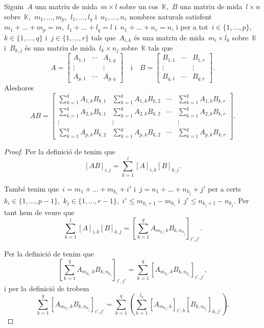 \documentclass[../../Main.tex]{subfiles}
\begin{document}
	\begin{proposition}
		\label{prop:producte de matrius en blocs}
		Siguin~\(A\) una matriu de mida~\(m\times l\) sobre un cos~\(\mathbb{K}\),~\(B\) una matriu de mida~\(l\times n\) sobre~\(\mathbb{K}\),~\(m_{1},\dots,m_{p}\),~\(l_{1},\dots,l_{q}\) i~\(n_{1},\dots,n_{r}\) nombres naturals satisfent~\(m_{1}+\dots+m_{p}=m\),~\(l_{1}+\dots+l_{q}=l\) i~\(n_{1}+\dots+n_{r}=n\), i per a tot~\(i\in\{1,\dots,p\}\),~\(k\in\{1,\dots,q\}\) i~\(j\in\{1,\dots,r\}\) tals que~\(A_{i,k}\) és una matriu de mida~\(m_{i}\times l_{k}\) sobre~\(\mathbb{K}\) i~\(B_{k,j}\) és una matriu de mida~\(l_{k}\times n_{j}\) sobre~\(\mathbb{K}\) tals que
		\[A=\left[\begin{matrix}
		A_{1,1} & \cdots & A_{1,q} \\
		\vdots & & \vdots \\
		A_{p,1} & \cdots & A_{p,q}
		\end{matrix}\right]\quad\text{i}\quad B=\left[\begin{matrix}
		B_{1,1} & \cdots & B_{1,r} \\
		\vdots & & \vdots \\
		B_{q,1} & \cdots & B_{q,r}
		\end{matrix}\right].\]
		Aleshores
		\[AB=\left[\begin{matrix}
		\sum_{k=1}^{q}A_{1,k}B_{k,1} & \sum_{k=1}^{q}A_{1,k}B_{k,2} & \cdots & \sum_{k=1}^{q}A_{1,k}B_{k,r} \\
		\sum_{k=1}^{q}A_{2,k}B_{k,1} & \sum_{k=1}^{q}A_{2,k}B_{k,2} & \cdots & \sum_{k=1}^{q}A_{2,k}B_{k,r} \\
		\vdots & \vdots & & \vdots \\
		\sum_{k=1}^{q}A_{p,k}B_{k,2} & \sum_{k=1}^{q}A_{p,k}B_{k,2} & \cdots & \sum_{k=1}^{q}A_{p,k}B_{k,r}
		\end{matrix}\right].\]
		\begin{proof}
			Per la definició de  tenim que
			\[
			    [AB]_{i,j}=\sum_{k=1}^{l}[A]_{i,k}[B]_{k,j}.
			\]

			També tenim que~\(i=m_{1}+\dots+m_{k_{i}}+i'\) i~\(j=n_{1}+\dots+n_{k_{j}}+j'\) per a certs~\(k_{i}\in\{1,\dots,p-1\}\),~\(k_{j}\in\{1,\dots,r-1\}\),~\(i'\leq m_{k_{i}+1}-m_{k_{i}}\) i~\(j'\leq n_{k_{j}+1}-n_{k_{j}}\).
			Per tant hem de veure que
			\[
			    \sum_{k=1}^{l}[A]_{i,k}[B]_{k,j}=\left[\sum_{k=1}^{q}A_{m_{k_{i}},k}B_{k,n_{k_{j}}}\right]_{i',j'}.
			\]

			Per la definició de  tenim que
			\[
			    \left[\sum_{k=1}^{q}A_{m_{k_{i}},k}B_{k,n_{k_{j}}}\right]_{i',j'}=\sum_{k=1}^{q}[A_{m_{k_{i}},k}B_{k,n_{k_{j}}}]_{i',j'},
			\]
			i per la definició de  trobem
			\[
			    \sum_{k=1}^{q}[A_{m_{k_{i}},k}B_{k,n_{k_{j}}}]_{i',j'}=\sum_{k=1}^{q}\left(\sum_{h=1}^{l_{k}}[A_{m_{k_{i}},k}]_{i',h}[B_{k,n_{k_{j}}}]_{h,j'}\right).
			\]


\end{proof}
\end{proposition}
\end{document}

